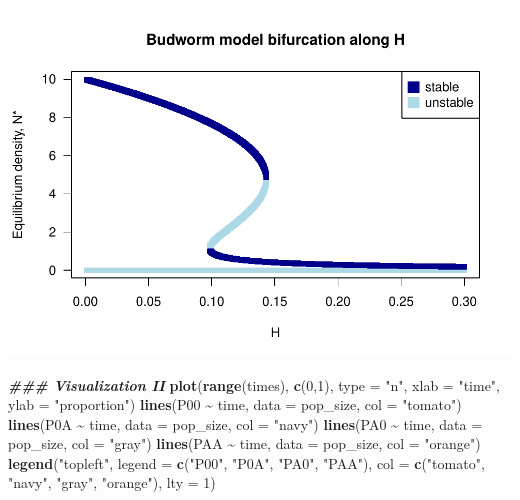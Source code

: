 \documentclass[
]{book}
\newenvironment{Shaded}{\begin{snugshade}}{\end{snugshade}}
\newcommand{\AttributeTok}[1]{\textcolor[rgb]{0.13,0.29,0.53}{#1}}
\newcommand{\DecValTok}[1]{\textcolor[rgb]{0.00,0.00,0.81}{#1}}
\newcommand{\DocumentationTok}[1]{\textcolor[rgb]{0.56,0.35,0.01}{\textbf{\textit{#1}}}}
\newcommand{\FunctionTok}[1]{\textcolor[rgb]{0.13,0.29,0.53}{\textbf{#1}}}
\newcommand{\NormalTok}[1]{#1}
\newcommand{\SpecialCharTok}[1]{\textcolor[rgb]{0.81,0.36,0.00}{\textbf{#1}}}
\newcommand{\StringTok}[1]{\textcolor[rgb]{0.31,0.60,0.02}{#1}}
\begin{document}
\includegraphics{bookdown-demo_files/figure-latex/unnamed-chunk-20-1.pdf}

\begin{Shaded}
\begin{Highlighting}[]
\DocumentationTok{\#\#\# Visualization II}
\FunctionTok{plot}\NormalTok{(}\FunctionTok{range}\NormalTok{(times), }\FunctionTok{c}\NormalTok{(}\DecValTok{0}\NormalTok{,}\DecValTok{1}\NormalTok{), }\AttributeTok{type =} \StringTok{"n"}\NormalTok{, }\AttributeTok{xlab =} \StringTok{"time"}\NormalTok{, }\AttributeTok{ylab =} \StringTok{"proportion"}\NormalTok{)}
\FunctionTok{lines}\NormalTok{(P00 }\SpecialCharTok{\textasciitilde{}}\NormalTok{ time, }\AttributeTok{data =}\NormalTok{ pop\_size, }\AttributeTok{col =} \StringTok{"tomato"}\NormalTok{)}
\FunctionTok{lines}\NormalTok{(P0A }\SpecialCharTok{\textasciitilde{}}\NormalTok{ time, }\AttributeTok{data =}\NormalTok{ pop\_size, }\AttributeTok{col =} \StringTok{"navy"}\NormalTok{)}
\FunctionTok{lines}\NormalTok{(PA0 }\SpecialCharTok{\textasciitilde{}}\NormalTok{ time, }\AttributeTok{data =}\NormalTok{ pop\_size, }\AttributeTok{col =} \StringTok{"gray"}\NormalTok{)}
\FunctionTok{lines}\NormalTok{(PAA }\SpecialCharTok{\textasciitilde{}}\NormalTok{ time, }\AttributeTok{data =}\NormalTok{ pop\_size, }\AttributeTok{col =} \StringTok{"orange"}\NormalTok{)}
\FunctionTok{legend}\NormalTok{(}\StringTok{"topleft"}\NormalTok{, }\AttributeTok{legend =} \FunctionTok{c}\NormalTok{(}\StringTok{"P00"}\NormalTok{, }\StringTok{"P0A"}\NormalTok{, }\StringTok{"PA0"}\NormalTok{, }\StringTok{"PAA"}\NormalTok{), }\AttributeTok{col =} \FunctionTok{c}\NormalTok{(}\StringTok{"tomato"}\NormalTok{, }\StringTok{"navy"}\NormalTok{, }\StringTok{"gray"}\NormalTok{, }\StringTok{"orange"}\NormalTok{), }\AttributeTok{lty =} \DecValTok{1}\NormalTok{)}
\end{Highlighting}
\end{Shaded}
\end{document}
